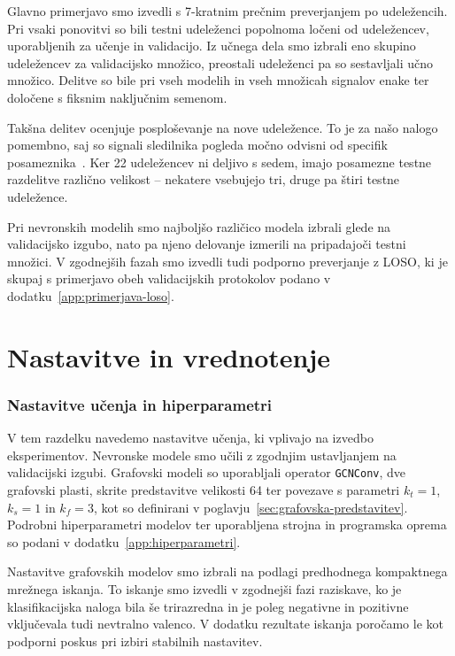 Glavno primerjavo smo izvedli s 7-kratnim prečnim preverjanjem po udeležencih.
Pri vsaki ponovitvi so bili testni udeleženci popolnoma ločeni od udeležencev, uporabljenih za učenje in validacijo.
Iz učnega dela smo izbrali eno skupino udeležencev za validacijsko množico, preostali udeleženci pa so sestavljali učno množico.
Delitve so bile pri vseh modelih in vseh množicah signalov enake ter določene s fiksnim naključnim semenom.

Takšna delitev ocenjuje posploševanje na nove udeležence.
To je za našo nalogo pomembno, saj so signali sledilnika pogleda močno odvisni od specifik posameznika~\cite{lim2020emotion}.
Ker 22 udeležencev ni deljivo s sedem, imajo posamezne testne razdelitve različno velikost -- nekatere vsebujejo tri, druge pa štiri testne udeležence.

Pri nevronskih modelih smo najboljšo različico modela izbrali glede na validacijsko izgubo, nato pa njeno delovanje izmerili na pripadajoči testni množici.
V zgodnejših fazah smo izvedli tudi podporno preverjanje z LOSO, ki je skupaj s primerjavo obeh validacijskih protokolov podano v dodatku~\ref{app:primerjava-loso}.


\section{Nastavitve in vrednotenje}
\label{subsec:nastavitve-ucenja}

\subsubsection*{Nastavitve učenja in hiperparametri}

V tem razdelku navedemo nastavitve učenja, ki vplivajo na izvedbo eksperimentov.
Nevronske modele smo učili z zgodnjim ustavljanjem na validacijski izgubi.
Grafovski modeli so uporabljali operator \texttt{GCNConv}, dve grafovski plasti, skrite predstavitve velikosti 64 ter povezave s parametri $k_t=1$, $k_s=1$ in $k_f=3$, kot so definirani v poglavju~\ref{sec:grafovska-predstavitev}.
Podrobni hiperparametri modelov ter uporabljena strojna in programska oprema so podani v dodatku~\ref{app:hiperparametri}.

Nastavitve grafovskih modelov smo izbrali na podlagi predhodnega kompaktnega mrežnega iskanja.
To iskanje smo izvedli v zgodnejši fazi raziskave, ko je klasifikacijska naloga bila še trirazredna in je poleg negativne in pozitivne vključevala tudi nevtralno valenco.
V dodatku rezultate iskanja poročamo le kot podporni poskus pri izbiri stabilnih nastavitev.

